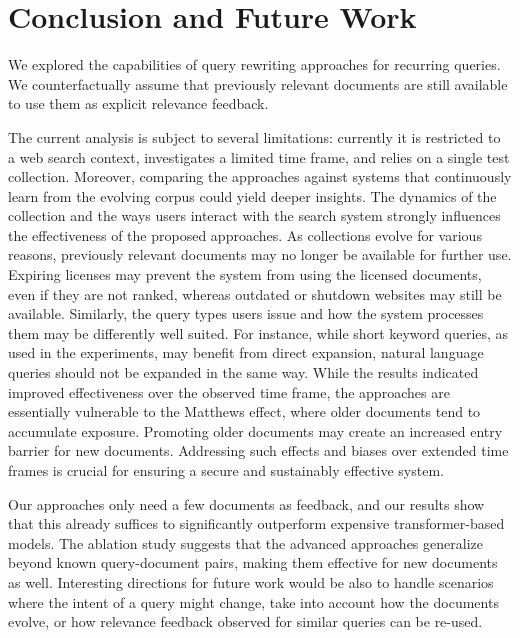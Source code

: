 \section{Conclusion and Future Work}
We explored the capabilities of query rewriting approaches for recurring queries. We counterfactually assume that previously relevant documents are still available to use them as explicit relevance feedback.  

The current analysis is subject to several limitations: currently it is restricted to a web search context, investigates a limited time frame, and relies on a single test collection. Moreover, comparing the approaches against systems that continuously learn from the evolving corpus could yield deeper insights. The dynamics of the collection and the ways users interact with the search system strongly influences the effectiveness of the proposed approaches. As collections evolve for various reasons, previously relevant documents may no longer be available for further use. Expiring licenses may prevent the system from using the licensed documents, even if they are not ranked, whereas outdated or shutdown websites may still be available. Similarly, the query types users issue and how the system processes them may be differently well suited. For instance, while short keyword queries, as used in the experiments, may benefit from direct expansion, natural language queries should not be expanded in the same way. While the results indicated improved effectiveness over the observed time frame, the approaches are essentially vulnerable to the Matthews effect, where older documents tend to accumulate exposure. Promoting older documents may create an increased entry barrier for new documents. Addressing such effects and biases over extended time frames is crucial for ensuring a secure and sustainably effective system. 

Our approaches only need a few documents as feedback, and our results show that this already suffices to significantly outperform expensive transformer-based models. The ablation study suggests that the advanced approaches generalize beyond known query-document pairs, making them effective for new documents as well. Interesting directions for future work would be also to handle scenarios where the intent of a query might change, take into account how the documents evolve, or how relevance feedback observed for similar queries can be re-used.


